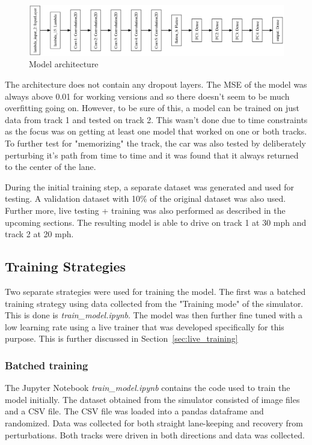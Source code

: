 \documentclass[paper=letter, fontsize=11pt]{scrartcl}
\numberwithin{equation}{section}		%
\numberwithin{figure}{section}			%
\numberwithin{table}{section}				%
\begin{document}
\begin{figure}[!htbp]
  \includegraphics[width=\linewidth]{model.png}
  \caption{Model architecture}
  \label{fig:model_arch}
\end{figure}

The architecture does not contain any dropout layers. The MSE of the model was always above 0.01 for working versions and so there doesn't seem to be much overfitting going on. However, to be sure of this, a model can be trained on just data from track 1 and tested on track 2. This wasn't done due to time constraints as the focus was on getting at least one model that worked on one or both tracks. To further test for "memorizing" the track, the car was also tested by deliberately perturbing it's path from time to time and it was found that it always returned to the center of the lane.

During the initial training step, a separate dataset was generated and used for testing. A validation dataset with 10\% of the original dataset was also used. Further more, live testing + training was also performed as described in the upcoming sections. The resulting model is able to drive on track 1 at 30 mph and track 2 at 20 mph.

\subsection{Training Strategies}

Two separate strategies were used for training the model. The first was a batched training strategy using data collected from the "Training mode" of the simulator. This is done is \emph{train\_model.ipynb}. The model was then further fine tuned with a low learning rate using a live trainer that was developed specifically for this purpose. This is further discussed in Section~\ref{sec:live_training}

\subsubsection{Batched training}
\label{sec:batched_training}

The Jupyter Notebook \emph{train\_model.ipynb} contains the code used to train the model initially. The dataset obtained from the simulator consisted of image files and a CSV file. The CSV file was loaded into a pandas dataframe and randomized. Data was collected for both straight lane-keeping and recovery from perturbations. Both tracks were driven in both directions and data was collected. 
\end{document}
